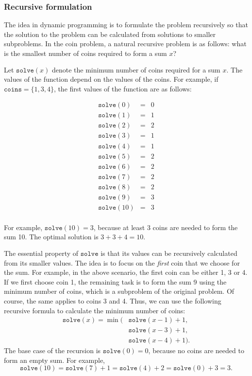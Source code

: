\subsubsection{Recursive formulation}

The idea in dynamic programming is to
formulate the problem recursively so
that the solution to the problem can be
calculated from solutions to smaller
subproblems.
In the coin problem, a natural recursive
problem is as follows:
what is the smallest number of coins
required to form a sum $x$?

Let $\texttt{solve}(x)$
denote the minimum
number of coins required for a sum $x$.
The values of the function depend on the
values of the coins.
For example, if $\texttt{coins} = \{1,3,4\}$,
the first values of the function are as follows:

\[
\begin{array}{lcl}
\texttt{solve}(0) & = & 0 \\
\texttt{solve}(1) & = & 1 \\
\texttt{solve}(2) & = & 2 \\
\texttt{solve}(3) & = & 1 \\
\texttt{solve}(4) & = & 1 \\
\texttt{solve}(5) & = & 2 \\
\texttt{solve}(6) & = & 2 \\
\texttt{solve}(7) & = & 2 \\
\texttt{solve}(8) & = & 2 \\
\texttt{solve}(9) & = & 3 \\
\texttt{solve}(10) & = & 3 \\
\end{array}
\]

For example, $\texttt{solve}(10)=3$,
because at least 3 coins are needed
to form the sum 10.
The optimal solution is $3+3+4=10$.

The essential property of $\texttt{solve}$ is
that its values can be
recursively calculated from its smaller values.
The idea is to focus on the \emph{first}
coin that we choose for the sum.
For example, in the above scenario,
the first coin can be either 1, 3 or 4.
If we first choose coin 1,
the remaining task is to form the sum 9
using the minimum number of coins,
which is a subproblem of the original problem.
Of course, the same applies to coins 3 and 4.
Thus, we can use the following recursive formula
to calculate the minimum number of coins:
\begin{equation*}
\begin{split}
\texttt{solve}(x) = \min( & \texttt{solve}(x-1)+1, \\
                           & \texttt{solve}(x-3)+1, \\
                           & \texttt{solve}(x-4)+1).
\end{split}
\end{equation*}
The base case of the recursion is $\texttt{solve}(0)=0$,
because no coins are needed to form an empty sum.
For example,
\[ \texttt{solve}(10) = \texttt{solve}(7)+1 = \texttt{solve}(4)+2 = \texttt{solve}(0)+3 = 3.\]

